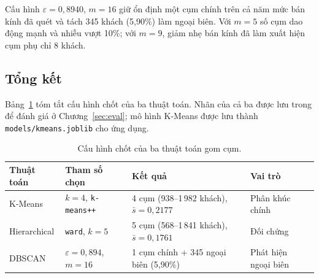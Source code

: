 \documentclass[../report.tex]{subfiles}
\begin{document}
Cấu hình $\varepsilon = 0,8940$, $m = 16$ giữ ổn định một cụm chính trên cả năm mức bán kính đã quét và tách 345 khách (5,90\%) làm ngoại biên. Với $m = 5$ số cụm dao động mạnh và nhiễu vượt 10\%; với $m = 9$, giảm nhẹ bán kính đã làm xuất hiện cụm phụ chỉ 8 khách.

\subsection{Tổng kết}

Bảng~\ref{tab:ch4_summary} tóm tắt cấu hình chốt của ba thuật toán. Nhãn của cả ba được lưu trong  để đánh giá ở Chương~\ref{sec:eval}; mô hình K-Means được lưu thành \texttt{models/kmeans.joblib} cho ứng dụng.

\begin{table}[H]
\centering
\small
\begin{tabularx}{\textwidth}{@{}l l X l@{}}
\toprule
\textbf{Thuật toán} & \textbf{Tham số chọn} & \textbf{Kết quả} & \textbf{Vai trò} \\
\midrule
K-Means & $k=4$, \texttt{k-means++} & 4 cụm (938--1\,982 khách), $\bar{s} = 0,2177$ & Phân khúc chính \\
Hierarchical & \texttt{ward}, $k=5$ & 5 cụm (568--1\,841 khách), $\bar{s} = 0,1761$ & Đối chứng \\
DBSCAN & $\varepsilon=0,894$, $m=16$ & 1 cụm chính + 345 ngoại biên (5,90\%) & Phát hiện ngoại biên \\
\bottomrule
\end{tabularx}
\caption{Cấu hình chốt của ba thuật toán gom cụm.}
\label{tab:ch4_summary}
\end{table}
\end{document}
